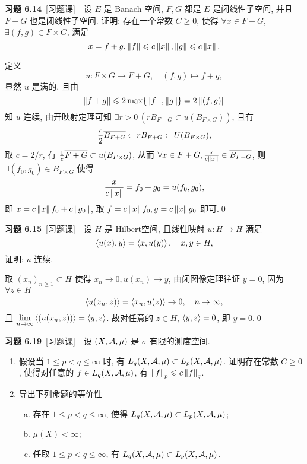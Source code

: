 	\textbf{习题 6.14}\ [习题课]\ \ 设 $ E $ 是 Banach 空间, $ F, G $ 都是 $ E $ 是闭线性子空间, 并且 $ F+G $ 也是闭线性子空间. 证明: 存在一个常数 $ C\geqslant0 $, 使得 $ \forall x\in F+G $, $ \exists(f, g)\in F\times G $, 满足
	\[
		x=f+g, \norm{f}\leqslant c\norm{x}, \norm{g}\leqslant c\norm{x}.
	\]
	\begin{Proof}
		定义
		\[
			u:F\times G\to F+G,\quad (f, g)\mapsto f+g,
		\]
		显然 $ u $ 是满的, 且由 
		\[
			\norm{f+g}\leqslant 2\max\{ \norm{f}, \norm{g} \}=2\norm{(f, g)}
		\]
		知 $ u $ 连续, 由开映射定理可知 $ \exists r>0\,(rB_{F+G}\subset u(B_{F\times G})) $, 且有
		\[
			\frac{r}{2}\baro{B_{F+G}}\subset rB_{F+G}\subset U(B_{F\times G}),
		\]
		取 $ c=2/r $, 有 $ \frac{1}{c}\baro{F+G}\subset u(B_{F\times G}) $, 从而 $ \forall x\in F+G, \frac{x}{c\norm{x}}\in\baro{B_{F+G}} $, 则 $ \exists (f_{0}, g_{0})\in B_{F\times G} $ 使得
		\[
			\frac{x}{c\norm{x}}=f_{0}+g_{0}=u(f_{0}, g_{0}),
		\]
		即 $ x = c\norm{x}f_{0}+c\norm{g_{0}} $, 取 $ f=c\norm{x}f_{0} , g = c\norm{x}g_{0} $ 即可.\qed
	\end{Proof}
	\textbf{习题 6.15}\ [习题课]\ \ 设 $ H $ 是 Hilbert空间, 且线性映射 $ u:H\to H $ 满足
	\[
		\lrangle{u(x), y}=\lrangle{x, u(y)}, \quad x, y\in H,
	\]
	证明: $ u $ 连续.
	\begin{Proof}
		取 $ (x_{n})_{n\geqslant1}\subset H $ 使得 $ x_{n}\to 0, u(x_{n})\to y $, 由闭图像定理往证 $ y=0 $, 因为 $ \forall z\in H $
		\[
			\lrangle{u(x_{n}, z)}=\lrangle{x_{n}, u(z)}\to 0,\quad n\to \infty,
		\]
		且 $ \lim\limits_{n\to\infty}\lrangle{(u(x_{n}, z))}=\lrangle{y, z} $. 故对任意的 $ z\in H $, $ \lrangle{y, z}=0 $, 即 $ y=0 $.\qed
	\end{Proof}
	\textbf{习题 6.19}\ [习题课]\ \ 设 $ (X, \CA, \mu) $ 是 $ \sigma $-有限的测度空间.
	\begin{enumerate}[(1)]
		\item 假设当 $ 1\leqslant p<q\leqslant\infty $ 时, 有 $ L_{q}(X, \CA, \mu)\subset L_{p}(X, \CA, \mu) $. 证明存在常数 $ C\geqslant0 $, 使得对任意的 $ f\in L_{q}(X, \CA, \mu) $, 有 $ \norm{f}_{p}\leqslant c\norm{f}_{q} $.
		\item 导出下列命题的等价性
		\begin{enumerate}[a. ]
			\item 存在 $ 1\leqslant p<q\leqslant\infty $, 使得 $ L_{q}(X, \CA, \mu)\subset L_{p}(X, \CA, \mu) $;
			\item $ \mu(X)<\infty $;
			\item 任取 $ 1\leqslant p<q\leqslant\infty $, 有 $ L_{q}(X, \CA, \mu)\subset L_{p}(X, \CA, \mu) $.
		\end{enumerate}
	\end{enumerate}
